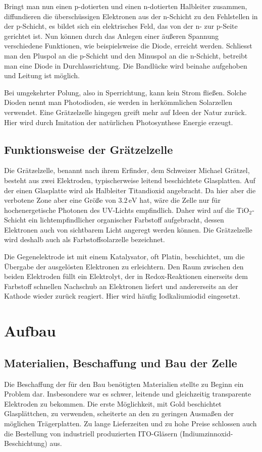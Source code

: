 \documentclass[11pt]{scrartcl}
\newcommand{\unit}[1]{\ensuremath{\,\mathrm{#1}}} %
\begin{document}
Bringt man nun einen p-dotierten und einen n-dotierten Halbleiter zusammen, diffundieren die \"ubersch\"ussigen Elektronen aus der n-Schicht zu den Fehlstellen in der p-Schicht, es bildet sich ein elektrisches Feld, das von der n- zur p-Seite gerichtet ist. Nun k\"onnen durch das Anlegen einer \"au\ss{}eren Spannung verschiedene Funktionen, wie beispielsweise die Diode, erreicht werden. Schliesst man den Pluspol an die p-Schicht und den Minuspol an die n-Schicht, betreibt man eine Diode in Durchlassrichtung. Die Bandl\"ucke wird beinahe aufgehoben und Leitung ist m\"oglich.

Bei umgekehrter Polung, also in Sperrichtung, kann kein Strom flie\ss{}en. Solche Dioden nennt man Photodioden, sie werden in herk\"ommlichen Solarzellen verwendet. Eine Gr\"atzelzelle hingegen greift mehr auf Ideen der Natur zur\"uck. Hier wird durch Imitation der nat\"urlichen Photosynthese Energie erzeugt.



\subsection{Funktionsweise der Gr\"atzelzelle}
Die Gr\"atzelzelle, benannt nach ihrem Erfinder, dem Schweizer Michael Gr\"atzel, besteht aus zwei Elektroden, typischerweise leitend beschichtete Glasplatten. Auf der einen Glasplatte wird als Halbleiter Titandioxid angebracht. Da hier aber die verbotene Zone aber eine Gr\"o\ss{}e von $3.2\unit{eV}$ hat, w\"are die Zelle nur f\"ur hochenergetische Photonen des UV-Lichts empfindlich. Daher wird auf die TiO$_{2}$-Schicht ein lichtempfindlicher organischer Farbstoff aufgebracht, dessen Elektronen auch von sichtbarem Licht angeregt werden k\"onnen. Die Gr\"atzelzelle wird deshalb auch als Farbstoffsolarzelle bezeichnet.

Die Gegenelektrode ist mit einem Katalysator, oft Platin, beschichtet, um die \"Ubergabe der ausgel\"osten Elektronen zu erleichtern. Den Raum zwischen den beiden Elektroden f\"ullt ein Elektrolyt, der in Redox-Reaktionen einerseits dem Farbstoff schnellen Nachschub an Elektronen liefert und andererseits an der Kathode wieder zur\"uck reagiert. Hier wird h\"aufig Iodkaliumiodid eingesetzt.





\section{Aufbau}
\subsection{Materialien, Beschaffung und Bau der Zelle}
Die Beschaffung der f\"ur den Bau ben\"otigten Materialien stellte zu Beginn ein Problem dar. Insbesondere war es schwer, leitende und gleichzeitig transparente Elektroden zu bekommen. Die erste M\"oglichkeit, mit Gold beschichtet Glaspl\"attchen, zu verwenden, scheiterte an den zu geringen Ausma\ss{}en der m\"oglichen Tr\"agerplatten. Zu lange Lieferzeiten und zu hohe Preise schlossen auch die Bestellung von industriell produzierten ITO-Gl\"asern (Indiumzinnoxid-Beschichtung) aus.
\end{document}
